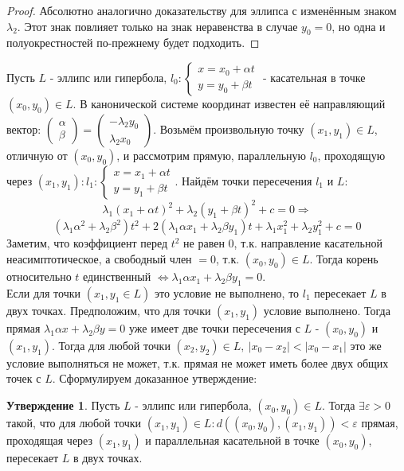 \documentclass[a4paper, 12pt]{article}
\renewcommand{\epsilon}{\varepsilon}
\theoremstyle{definition}
\newtheorem*{subtheorem}{Утверждение}
\begin{document}
	\begin{proof}
		Абсолютно аналогично доказательству для эллипса с изменённым знаком $\lambda_2$.
		Этот знак повлияет только на знак неравенства в случае $y_0 = 0$, но одна и полуокрестностей по-прежнему будет подходить.
	\end{proof}
	
	Пусть $L$ - эллипс или гипербола, $l_0: \begin{cases}
	x = x_0 + \alpha t\\
	y = y_0 + \beta t
	\end{cases}$ - касательная в точке $(x_0, y_0)\in L$. В канонической системе координат известен её направляющий вектор: $\begin{pmatrix} \alpha \\ \beta \end{pmatrix} = \begin{pmatrix} -\lambda_2y_0 \\ \lambda_2x_0 \end{pmatrix}$. Возьмём произвольную точку $(x_1, y_1)\in L$, отличную от $(x_0, y_0)$, и рассмотрим прямую, параллельную $l_0$, проходящую через $(x_1, y_1): l_1: \begin{cases}
	x = x_1 + \alpha t\\
	y = y_1 + \beta t
	\end{cases}$. Найдём точки пересечения $l_1$ и $L$:
	$$\lambda_1(x_1+\alpha t)^2+\lambda_2(y_1+\beta t)^2+c = 0 \Rightarrow$$ $$(\lambda_1\alpha^2 + \lambda_2\beta^2)t^2 + 2(\lambda_1\alpha x_1 + \lambda_2\beta y_1)t + \lambda_1x_1^2 + \lambda_2y_1^2 + c = 0$$
	Заметим, что коэффициент перед $t^2$ не равен 0, т.к. направление касательной неасимптотическое, а свободный член $= 0$, т.к. $(x_0, y_0)\in L$. Тогда корень относительно $t$ единственный $\Leftrightarrow \lambda_1\alpha x_1 + \lambda_2\beta y_1 = 0$.\\
	Если для точки $(x_1, y_1 \in L)$ это условие не выполнено, то $l_1$ пересекает $L$ в двух точках.
	Предположим, что для точки $(x_1, y_1)$ условие выполнено. Тогда прямая $\lambda_1\alpha x + \lambda_2\beta y = 0$ уже имеет две точки пересечения с $L$ - $(x_0, y_0)$ и $(x_1, y_1)$. Тогда для любой точки $(x_2, y_2) \in L, \ |x_0 - x_2| < |x_0 - x_1|$ это же условие выполняться не может, т.к. прямая не может иметь более двух общих точек с $L$. Сформулируем доказанное утверждение:
	\begin{subtheorem}
		Пусть $L$ - эллипс или гипербола, $(x_0, y_0)\in L$. Тогда $\exists \epsilon > 0$ такой, что для любой точки $(x_1, y_1) \in L: d((x_0, y_0), (x_1, y_1)) < \epsilon$ прямая, проходящая через $(x_1, y_1)$ и параллельная касательной в точке $(x_0, y_0)$, пересекает $L$ в двух точках.
	\end{subtheorem} 
\end{document}
